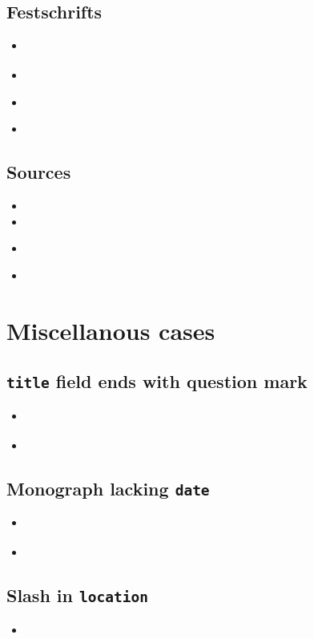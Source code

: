 \documentclass[a4paper,12pt,twoside]{scrartcl}
\newcommand*{\Feld}[1]{\texttt{#1}}
\begin{document}
\subsection{Festschrifts}
\begin{itemize}
    \item\cite{kronsbein:siepen:2015}%
    \item{}%
    \item\cites{auler:hiller:2015a}%
    \item{}%
\end{itemize}

\subsection{Sources}
\begin{itemize}
    \item{}
    \item{}
    \item\cites{test::source}%
    \item{}%
\end{itemize}

\section{Miscellanous cases}

\subsection{\Feld{title} field ends with question mark}
\begin{itemize}
    \item\cite{edenmo:1997}%
    \item{}
\end{itemize}

\subsection{Monograph lacking \Feld{date}}
\begin{itemize}
    \item\cite{siebert:u:et:al:o:j}%
    \item{}%
\end{itemize}


\subsection{Slash in \Feld{location}}
\begin{itemize}
    \item{}%
\end{itemize}
\end{document}
